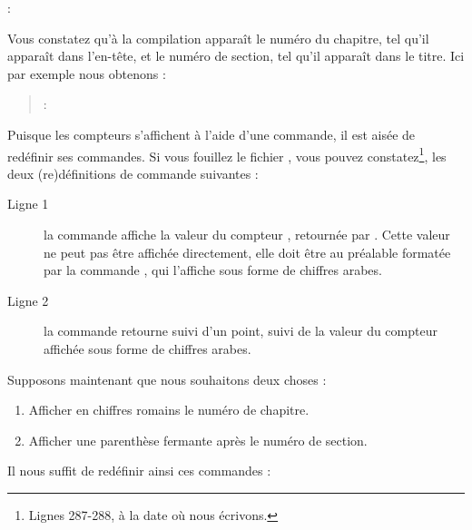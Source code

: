 \begin{latexcode}
\thechapter : \thesection
\end{latexcode}

Vous constatez qu'à la compilation apparaît le numéro du chapitre, tel qu'il apparaît dans l'en-tête, et le numéro de section, tel qu'il apparaît dans le titre. Ici par exemple nous obtenons :


\begin{quotation}
\thechapter : \thesection
\end{quotation}


Puisque les compteurs s'affichent à l'aide d'une commande, il est aisée de redéfinir ses commandes. Si vous fouillez le fichier , vous pouvez constatez\footnote{Lignes 287-288, à la date où nous écrivons.}, les deux (re)définitions de commande suivantes :

\begin{latexcode}
\renewcommand \thechapter {\@arabic\c@chapter}
\renewcommand \thesection {\thechapter.\@arabic\c@section}
\end{latexcode}

\begin{description}
\item[Ligne 1]la commande  affiche la valeur  du compteur , retournée par . Cette valeur ne peut pas être affichée directement, elle doit être au préalable formatée par la commande , qui l'affiche sous forme de chiffres arabes.
\item[Ligne 2]la commande  retourne  suivi d'un point, suivi de la valeur du compteur  affichée sous forme de chiffres arabes.
\end{description}

Supposons maintenant que nous souhaitons deux choses :
\begin{enumerate}
\item Afficher en chiffres romains le numéro de chapitre.
\item Afficher une parenthèse fermante après le numéro de section.
\end{enumerate}

Il nous suffit de redéfinir ainsi ces commandes :

\begin{latexcode}
\renewcommand \thechapter {\@Roman\c@chapter}
\renewcommand \thesection {\thechapter.\@arabic\c@section)~}
\end{latexcode} 

